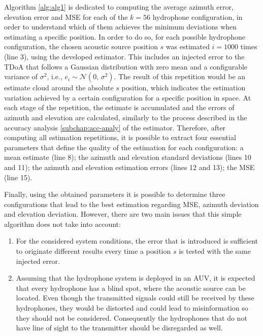 Algorithm \ref{alg:alg1} is dedicated to computing the average azimuth error, elevation error and MSE for each of the $k = 56$ hydrophone configuration, in order to understand which of them achieves the minimum deviations when estimating a specific position. In order to do so, for each possible hydrophone configuration, the chosen acoustic source position $s$ was estimated $i = 1000$ times (line 3), using the developed estimator. This includes an injected error to the TDoA that follows a Gaussian distribution with zero mean and a configurable variance of $\sigma^{2}$, i.e., $e_i \sim \mathcal{N}(0,\,\sigma^{2})$. The result of this repetition would be an estimate cloud around the absolute $s$ position, which indicates the estimation variation achieved by a certain configuration for a specific position in space. At each stage of the repetition, the estimate is accumulated and the errors of azimuth and elevation are calculated, similarly  to the process described in the accuracy analysis \ref{subchap:acc-analy} of the estimator. Therefore, after computing all estimation repetitions, it is possible to extract four essential parameters that define the quality of the estimation for each configuration: a mean estimate (line 8); the azimuth and elevation standard deviations (lines 10 and 11); the azimuth and elevation estimation errors (lines 12 and 13); the MSE (line 15).

Finally, using the obtained parameters it is possible to determine three configurations that lead to the best estimation regarding MSE, azimuth deviation and elevation deviation. However, there are two main issues that this simple algorithm does not take into account:

\begin{enumerate}
	
	\item  For the considered system conditions, the error that is introduced is sufficient to originate different results every time a position $s$ is tested with the same injected error.
	
	\item Assuming that the hydrophone system is deployed in an AUV, it is expected that every hydrophone has a blind spot, where the acoustic source can be located. Even though the transmitted signals could still be received by these hydrophones, they would be distorted and could lead to misinformation so they should not be considered. Consequently the hydrophones that do not have line of sight to the transmitter should be disregarded as well. 
	
\end{enumerate}

